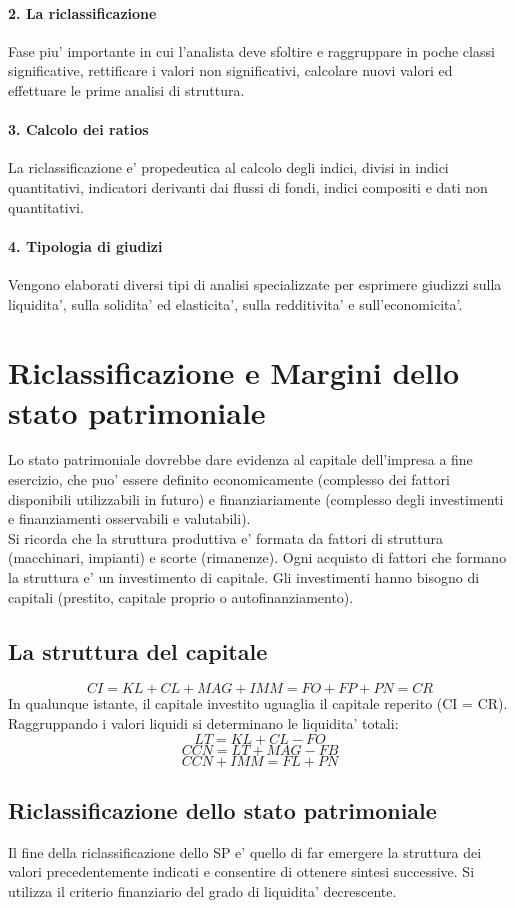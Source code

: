 \documentclass{report}
\begin{document}
	\paragraph{2. La riclassificazione} Fase piu' importante in cui l'analista deve sfoltire e raggruppare in poche classi significative, rettificare i valori non significativi, calcolare nuovi valori ed effettuare le prime analisi di struttura.
	\paragraph{3. Calcolo dei ratios} La riclassificazione e' propedeutica al calcolo degli indici, divisi in indici quantitativi, indicatori derivanti dai flussi di fondi, indici compositi e dati non quantitativi.
	\paragraph{4. Tipologia di giudizi} Vengono elaborati diversi tipi di analisi specializzate per esprimere giudizzi sulla liquidita', sulla solidita' ed elasticita', sulla redditivita' e sull'economicita'.
	
	\section{Riclassificazione e Margini dello stato patrimoniale}
	Lo stato patrimoniale dovrebbe dare evidenza al capitale dell'impresa a fine esercizio, che puo' essere definito economicamente (complesso dei fattori disponibili utilizzabili in futuro) e finanziariamente (complesso degli investimenti e finanziamenti osservabili e valutabili).
	\medskip \\Si ricorda che la struttura produttiva e' formata da fattori di struttura (macchinari, impianti) e scorte (rimanenze). Ogni acquisto di fattori che formano la struttura e' un investimento di capitale. Gli investimenti hanno bisogno di capitali (prestito, capitale proprio o autofinanziamento).
	\subsection{La struttura del capitale}
	\[CI = KL + CL + MAG + IMM = FO + FP + PN = CR\]
	In qualunque istante, il capitale investito uguaglia il capitale reperito (CI = CR).
	\medskip \\
	Raggruppando i valori liquidi si determinano le liquidita' totali:
	\[ LT = KL + CL - FO\]
	\[CCN = LT + MAG - FB\]
	\[CCN + IMM = FL + PN\]
	\subsection{Riclassificazione dello stato patrimoniale}
	Il fine della riclassificazione dello SP e' quello di far emergere la struttura dei valori precedentemente indicati e consentire di ottenere sintesi successive. Si utilizza il criterio finanziario del grado di liquidita' decrescente.
\end{document}
